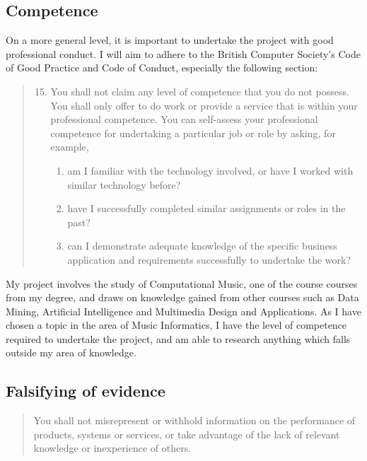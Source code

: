 \subsection{Competence}
On a more general level, it is important to undertake the project with good
professional conduct. I will aim to adhere to the British Computer Society's
Code of Good Practice and Code of Conduct, especially the following section:
\begin{quotation}
	\renewcommand{\labelenumi}{\arabic{enumi}.}
	\renewcommand{\labelenumii}{\roman{enumii}.}
	\begin{enumerate}
		\setcounter{enumi}{14}
		\item You shall not claim any level of competence that you do not possess. You shall only offer to do work or provide a service that is within your professional competence. You can self-assess your professional competence for undertaking a particular job or role by asking, for example,
		\begin{enumerate}
			\item am I familiar with the technology involved, or have I worked with similar technology before?
			\item have I successfully completed similar assignments or roles in the past?
			\item can I demonstrate adequate knowledge of the specific business application and requirements successfully to undertake the work?
		\end{enumerate}
	\end{enumerate}
\end{quotation}
My project involves the study of Computational Music, one of the course courses
from my degree, and draws on knowledge gained from other courses such as
Data Mining, Artificial Intelligence and Multimedia Design and Applications.
As I have chosen a topic in the area of Music Informatics, I have the level of
competence required to undertake the project, and am able to research anything
which falls outside my area of knowledge.
\subsection{Falsifying of evidence}
\begin{quotation}
You shall not misrepresent or withhold information on the performance of products, systems or services, or take advantage of the lack of relevant knowledge or inexperience of others.
\end{quotation}

